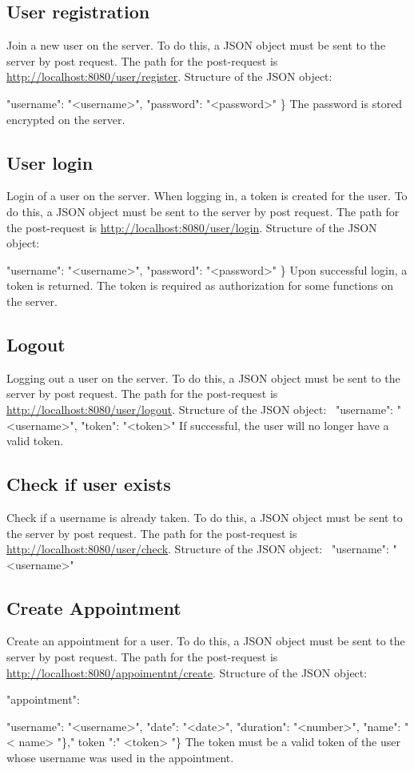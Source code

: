 \documentclass[12pt]{scrartcl}
\begin{document}
    \subsection{User registration}
        Join a new user on the server.
        To do this, a JSON object must be sent to the server by post request. The path for the post-request is
        \url{http://localhost:8080/user/register}.
        Structure of the JSON object: \ {"username": "<username>", "password": "<password>" \}
        The password is stored encrypted on the server.

    \subsection{User login}
        Login of a user on the server. When logging in, a token is created for the user.
        To do this, a JSON object must be sent to the server by post request. The path for the post-request is
        \url{http://localhost:8080/user/login}.
        Structure of the JSON object: \ {"username": "<username>", "password": "<password>" \}
        Upon successful login, a token is returned. The token is required as authorization for some functions on the server.
    
    \subsection{Logout}
        Logging out a user on the server.
        To do this, a JSON object must be sent to the server by post request. The path for the post-request is
        \url{http://localhost:8080/user/logout}.
        Structure of the JSON object: \ {"username": "<username>", "token": "<token>"}
        If successful, the user will no longer have a valid token.

    \subsection{Check if user exists}
        Check if a username is already taken.
        To do this, a JSON object must be sent to the server by post request. The path for the post-request is
        \url{http://localhost:8080/user/check}.
        Structure of the JSON object: \ {"username": "<username>"}

    \subsection{Create Appointment}
        Create an appointment for a user.
        To do this, a JSON object must be sent to the server by post request. The path for the post-request is
        \url{http://localhost:8080/appoimentnt/create}.
        Structure of the JSON object: \ {"appointment": \ {"username": "<username>", "date": "<date>", "duration": "<number>", "name": "< name> "\}," token ":" <token> "\}
        The token must be a valid token of the user whose username was used in the appointment.

}}}}
\end{document}
